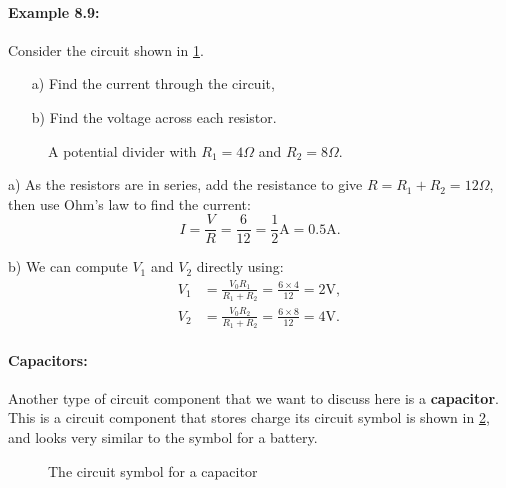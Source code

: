 \documentclass[a4paper,12pt]{book}
\begin{document}
\paragraph{Example 8.9:} Consider the circuit shown in \cref{fig: pd example}.
\begin{itemize}
\setlength{\itemsep}{-5pt}
    \item[a)] Find the current through the circuit,
    \item[b)] Find the voltage across each resistor.
\end{itemize}  
 \begin{figure}[ht]
    \centering
    \caption{A potential divider with $R_{1}=4\Omega$ and $R_{2}=8\Omega$.}
    \label{fig: pd example}
\end{figure}

a) As the resistors are in series, add the resistance to give $R=R_{1}+R_{2}=12\Omega$, then use Ohm's law to find the current:
\begin{equation*}
I=\frac{V}{R}=\frac{6}{12}=\frac{1}{2}\text{A}=0.5\text{A}.
\end{equation*}

b) We can compute $V_{1}$ and $V_{2}$ directly using:
\begin{align*}
V_{1}&=\frac{V_{0}R_{1}}{R_{1}+R_{2}}=\frac{6\times 4}{12}=2\text{V},\\
V_{2}&=\frac{V_{0}R_{2}}{R_{1}+R_{2}}=\frac{6\times 8}{12}=4\text{V}.
\end{align*}



\paragraph{Capacitors:} Another type of circuit component that we want to discuss here is a \textbf{capacitor}. This is a circuit component that stores charge its circuit symbol is shown in \cref{fig: capacitor}, and looks very similar to the symbol for a battery.
  \begin{figure}[ht]
    \centering
    \caption{The circuit symbol for a capacitor}
    \label{fig: capacitor}
\end{figure}
\end{document}
